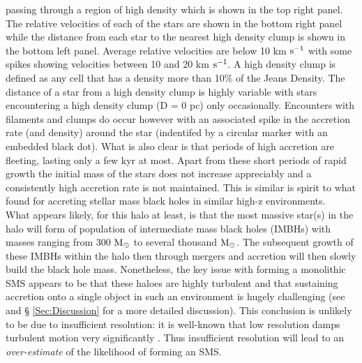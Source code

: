 \documentclass[twocolumn,iop,revtex4]{openjournal}
\newcommand{\kms} {km $\rm{s^{-1}}$}
\newcommand{\msolar} {$\rm{M_{\odot}}~$}
\newcommand{\msolarc} {$\rm{M_{\odot}}$}
\begin{document}
{passing through a region of high density which is shown in the top right panel. The relative velocities of each of the stars
are shown in the bottom right panel while the distance from each star to the nearest high density clump is
shown in the bottom left panel. Average relative velocities are below 10 \kms{} with some spikes showing
velocities between 10 and 20 \kms. A high density clump is defined as any cell that has a density more than
10\% of the  Jeans Density. The distance of a star from a high density clump is highly variable with stars
encountering a high density clump (D = 0 pc) only occasionally. Encounters
with filaments and clumps do occur however with an associated spike in
the accretion rate (and density) around the star (indentifed by a circular marker with an embedded black dot).
What is also clear is that periods of high accretion are fleeting, lasting only a few kyr at most. Apart from these
short periods of rapid growth the initial mass of the
stars does not increase appreciably and a consistently high accretion rate is not maintained. This is similar is
spirit to what \cite{Smith_2018} found for accreting stellar mass black holes in similar high-z environments.}\\
\indent What appears likely, for this halo at least, is that the 
most massive star(s) in the halo will form of population of intermediate mass black holes
(IMBHs) with masses ranging from 300 \msolar to several thousand \msolarc.
The subsequent
growth of these IMBHs within the halo then through 
mergers and accretion will then slowly build the black hole mass. 
Nonetheless, the key issue with forming a monolithic SMS appears to be that
these haloes are highly turbulent and that sustaining accretion onto a single
object in such an environment is hugely challenging (see \cite{Chon_2017b} and \S
\ref{Sec:Discussion} for a more detailed discussion).
This conclusion is unlikely to be due to insufficient resolution: it is
well-known that low resolution damps turbulent motion very significantly
\citep[e.g.][]{Federrath_2010a, Downes_2012}. Thus insufficient resolution
will lead to an {\it over-estimate} of the likelihood of forming an SMS.
\end{document}
